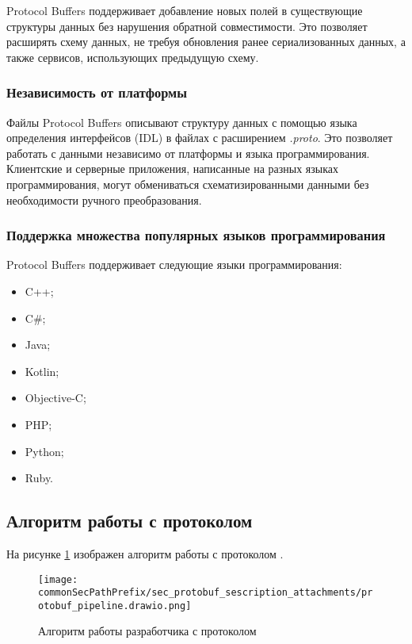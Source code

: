 Protocol Buffers поддерживает добавление новых полей в существующие структуры данных без нарушения обратной совместимости.
Это позволяет расширять схему данных, не требуя обновления ранее сериализованных данных, а также сервисов, использующих предыдущую схему.

\subsubsection{Независимость от платформы}

Файлы Protocol Buffers описывают структуру данных с помощью языка определения интерфейсов (IDL) в файлах с расширением \textit{.proto}.
Это позволяет работать с данными независимо от платформы и языка программирования.
Клиентские и серверные приложения, написанные на разных языках программирования, могут обмениваться схематизированными данными без необходимости ручного преобразования.

\newpage
\subsubsection{Поддержка множества популярных языков программирования}

Protocol Buffers поддерживает следующие языки программирования:
\begin{itemize}
    \item C++;
    \item C\#;
    \item Java;
    \item Kotlin;
    \item Objective-C;
    \item PHP;
    \item Python;
    \item Ruby.
\end{itemize}

\subsection{Алгоритм работы с протоколом}

На рисунке \ref{fig:protobuf_algo} изображен алгоритм работы с протоколом \cite{protobuf_doc}.
\begin{figure}[ht]
    \centering
    \texttt{[image: \\commonSecPathPrefix/sec\_protobuf\_sescription\_attachments/protobuf\_pipeline.drawio.png]}
    \caption{Алгоритм работы разработчика с протоколом}
    \label{fig:protobuf_algo}
\end{figure}

